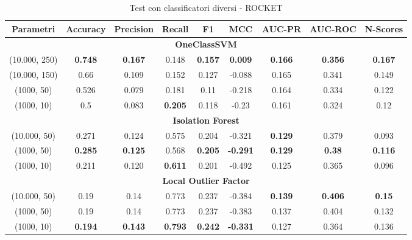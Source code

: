 \begin{table}[!ht]
    \centering
    \begin{adjustbox}{max width=\textwidth}
    \begin{tabular}{|c|c|c|c|c|c|c|c|c|}
    \hline
         \textbf{Parametri} & \textbf{Accuracy} &\textbf{Precision}  & \textbf{Recall} & \textbf{F1} & \textbf{MCC} & \textbf{AUC-PR} & \textbf{AUC-ROC} & \textbf{N-Scores}\\
        \hline
        \multicolumn{9}{|c|}{\textbf{OneClassSVM}} \\
        \hline
         (10.000, 250)&\textbf{0.748}& \textbf{0.167}& 0.148& \textbf{0.157}&\textbf{0.009}&\textbf{ 0.166} &\textbf{0.356} & \textbf{0.167}\\
         \hline
         (10.000, 150)&0.66& 0.109& 0.152& 0.127&-0.088& 0.165 &0.341 & 0.149\\
         \hline
         (1000, 50) &0.526& 0.079& 0.181& 0.11&-0.218& 0.164 &0.334 & 0.122\\
         \hline
        (1000, 10)&0.5 &0.083 &\textbf{0.205} &0.118 & -0.23& 0.161& 0.324&0.12\\
         \hline
         \multicolumn{9}{|c|}{\textbf{Isolation Forest}} \\
         \hline
         (10.000, 50)&0.271& 0.124& 0.575& 0.204&-0.321& \textbf{0.129} &0.379 & 0.093\\
         \hline
         (1000, 50) &\textbf{0.285}& \textbf{0.125}& 0.568& \textbf{0.205}&\textbf{-0.291}&\textbf{ 0.129} &\textbf{0.38} & \textbf{0.116}\\
         \hline
         (1000, 10)&0.211 &0.120 &\textbf{0.611} &0.201 & -0.492& 0.125& 0.365&0.096\\
         \hline
         \multicolumn{9}{|c|}{\textbf{Local Outlier Factor}} \\
         \hline
         (10.000, 50)&0.19 &0.14 &0.773 &0.237 &-0.384 &\textbf{0.139} &\textbf{0.406}& \textbf{0.15}\\
         \hline
         (1000, 50)&0.19 &0.14 &0.773 &0.237 & -0.383 &0.137 &0.404& 0.132\\
         \hline
         (1000, 10)&\textbf{0.194} &\textbf{0.143} &\textbf{0.793} &\textbf{0.242} &\textbf{-0.331} &0.127 &0.364& 0.136\\
         \hline
    \end{tabular}
    \end{adjustbox}
    \caption{Test con classificatori diversi - ROCKET}
    \label{tab:ROCKAD_NASA_AlgoritmiVari-ROCKET}
\end{table}

